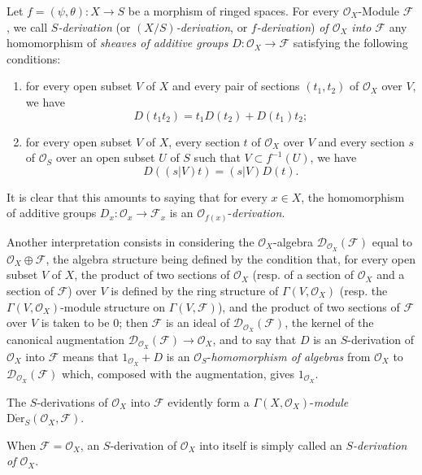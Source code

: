 \begin{env}[16.5.1]\label{IV.16.5.1}
Let $f=(\psi,\theta):X\to S$ be a morphism of ringed spaces. For every
$\mathcal{O}_X$-Module $\mathscr{F}$, we call \emph{$S$-derivation}
(or \emph{$(X/S)$-derivation}, or \emph{$f$-derivation}) \emph{of
$\mathcal{O}_X$ into $\mathscr{F}$} any homomorphism of \emph{sheaves of
additive groups} $D:\mathcal{O}_X\to\mathscr{F}$ satisfying the following
conditions:
\begin{enumerate}
\item[\emph{a)}] for every open subset $V$ of $X$ and every pair of sections
$(t_1,t_2)$ of $\mathcal{O}_X$ over $V$, we have
\[
  D(t_1t_2)=t_1D(t_2)+D(t_1)t_2;
  \tag{16.5.1.1}
  \label{IV.16.5.1.1}
\]
\item[\emph{b)}] for every open subset $V$ of $X$, every section $t$ of $\mathcal{O}_X$
over $V$ and every section $s$ of $\mathcal{O}_S$ over an open subset
$U$ of $S$ such that $V\subset f^{-1}(U)$, we have
\[
  D((s|V)t)=(s|V)D(t).
  \tag{16.5.1.2}
  \label{IV.16.5.1.2}
\]
\end{enumerate}
It is clear that this amounts to saying that for every $x\in X$,
the homomorphism of additive groups
$D_x:\mathcal{O}_x\to\mathscr{F}_x$ is an
$\mathcal{O}_{f(x)}$-\emph{derivation}.

Another interpretation consists in considering the $\mathcal{O}_X$-algebra
$\mathscr{D}_{\mathcal{O}_X}(\mathscr{F})$ equal to
$\mathcal{O}_X\oplus\mathscr{F}$, the algebra structure being defined by the
condition that, for every open subset $V$ of $X$, the product of two sections of
$\mathcal{O}_X$ (resp. of a section of $\mathcal{O}_X$ and a section of
$\mathscr{F}$) over $V$ is defined by the ring structure of
$\Gamma(V,\mathcal{O}_X)$ (resp. the
$\Gamma(V,\mathcal{O}_X)$-module structure on $\Gamma(V,\mathscr{F})$), and the
product of two sections of $\mathscr{F}$ over $V$ is taken to be 0; then
$\mathscr{F}$ is an ideal of
$\mathscr{D}_{\mathcal{O}_X}(\mathscr{F})$, the kernel of the canonical augmentation
$\mathscr{D}_{\mathcal{O}_X}(\mathscr{F})\to\mathcal{O}_X$, and to say that $D$
is an $S$-derivation of $\mathcal{O}_X$ into $\mathscr{F}$ means that
$1_{\mathcal{O}_X}+D$ is an $\mathcal{O}_S$-\emph{homomorphism of algebras} from
$\mathcal{O}_X$ to $\mathscr{D}_{\mathcal{O}_X}(\mathscr{F})$ which, composed
with the augmentation, gives $1_{\mathcal{O}_X}$.

The $S$-derivations of $\mathcal{O}_X$ into $\mathscr{F}$ evidently form
a $\Gamma(X,\mathcal{O}_X)$-\emph{module}
$\operatorname{D\acute{e}r}_S(\mathcal{O}_X,\mathscr{F})$.

When $\mathscr{F}=\mathcal{O}_X$, an $S$-derivation of $\mathcal{O}_X$ into
itself is simply called an \emph{$S$-derivation of $\mathcal{O}_X$}.
\end{env}

